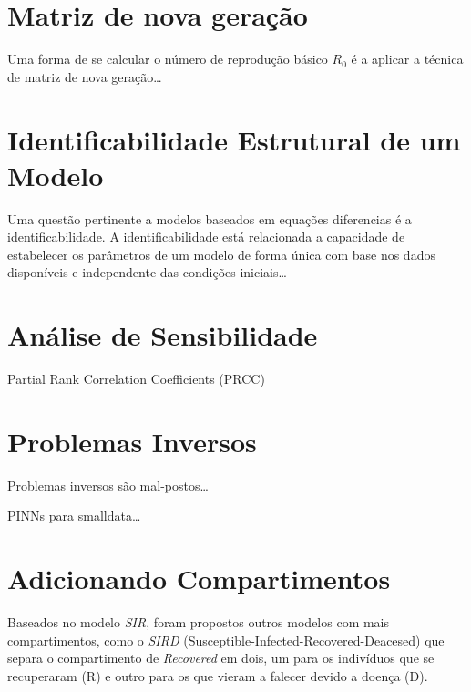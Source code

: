 \section{Matriz de nova geração}

Uma forma de se calcular o número de reprodução básico $R_0$ é a aplicar a técnica
de matriz de nova geração\dots

\section{Identificabilidade Estrutural de um Modelo}

Uma questão pertinente a modelos baseados em equações diferencias é a 
identificabilidade. A identificabilidade está relacionada a capacidade de 
estabelecer os parâmetros de um modelo de forma única com base nos dados disponíveis
e independente das condições iniciais\dots

\section{Análise de Sensibilidade}

Partial Rank Correlation Coefficients (PRCC)

\section{Problemas Inversos}

Problemas inversos são mal-postos\dots

PINNs para smalldata\dots

\section{Adicionando Compartimentos}

Baseados no modelo \textit{SIR}, foram propostos outros modelos com mais 
compartimentos, como o \textit{SIRD} (Susceptible-Infected-Recovered-Deacesed) 
\cite{giles:77-sird} que separa o compartimento de \textit{Recovered} em dois, um
para os indivíduos que se recuperaram (R) e outro para os que vieram a falecer devido
a doença (D).

